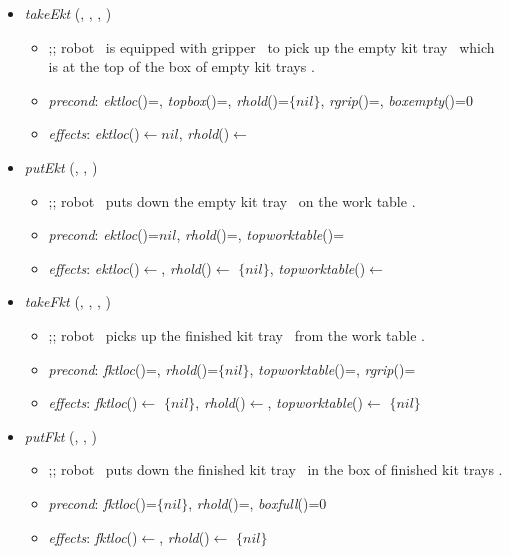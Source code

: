 \begin{itemize}

\item \textit{takeEkt} (\robot, \ekt, \boxekt, \grip)
\begin{itemize}
\item ;; robot \robot\ is equipped with gripper \grip\ to pick up the empty kit tray \ekt\ which is at the top of the box of empty kit trays \boxekt.
\item \textit{precond}: \textit{ektloc}(\ekt)=\boxekt, \textit{topbox}(\boxekt)=\ekt, \textit{rhold}(\robot)=$\lbrace nil\rbrace$, \textit{rgrip}(\robot)=\grip, \textit{boxempty}(\boxekt)=0
\item \textit{effects}: \textit{ektloc}(\ekt)$\leftarrow nil$, \textit{rhold}(\robot)$\leftarrow$\ekt
\end{itemize}

\item \textit{putEkt} (\robot, \ekt, \wtable)
\begin{itemize}
\item ;; robot \robot\ puts down the empty kit tray \ekt\ on the work table \wtable.
\item \textit{precond}: \textit{ektloc}(\ekt)=$nil$, \textit{rhold}(\robot)=\ekt, \textit{topworktable}(\wtable)=\nil
\item \textit{effects}: \textit{ektloc}(\ekt)$\leftarrow$\wtable, \textit{rhold}(\robot)$\leftarrow$ $\lbrace nil\rbrace$, \textit{topworktable}(\wtable)$\leftarrow$\ekt
\end{itemize}

\item \textit{takeFkt} (\robot, \fkt, \wtable, \grip)
\begin{itemize}
\item ;; robot \robot\ picks up the finished kit tray \fkt\ from the work table \wtable.
\item \textit{precond}: \textit{fktloc}(\fkt)=\wtable, \textit{rhold}(\robot)=$\lbrace nil\rbrace$, \textit{topworktable}(\wtable)=\fkt, \textit{rgrip}(\robot)=\grip
\item \textit{effects}: \textit{fktloc}(\fkt)$\leftarrow$ $\lbrace nil\rbrace$, \textit{rhold}(\robot)$\leftarrow$\fkt, \textit{topworktable}(\wtable)$\leftarrow$ $\lbrace nil\rbrace$
\end{itemize}

\item \textit{putFkt} (\robot, \fkt, \boxfkt)
\begin{itemize}
\item ;; robot \robot\ puts down the finished kit tray \fkt\ in the box of finished kit trays \boxfkt.
\item \textit{precond}: \textit{fktloc}(\fkt)=$\lbrace nil\rbrace$, \textit{rhold}(\robot)=\fkt, \textit{boxfull}(\boxfkt)=0
\item \textit{effects}: \textit{fktloc}(\fkt)$\leftarrow$\boxfkt, \textit{rhold}(\robot)$\leftarrow$ $\lbrace nil\rbrace$
\end{itemize}


\end{itemize}
